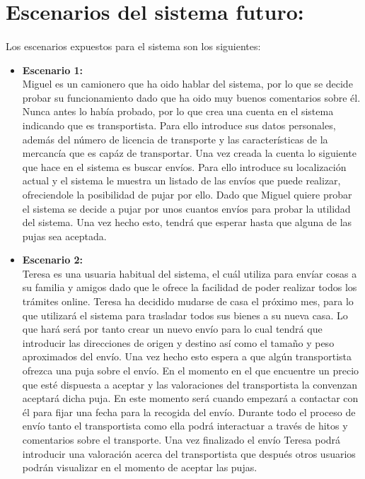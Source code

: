 \documentclass[10pt, a4paper,spanish]{article}
\begin{document}
	\section{Escenarios del sistema futuro:}

		\paragraph{}
		Los escenarios expuestos para el sistema son los siguientes:

		\begin{itemize}
			\item \textbf{Escenario 1:} \\
				Miguel es un camionero que ha oido hablar del sistema, por lo que se decide probar su funcionamiento dado que ha oido muy buenos comentarios sobre él. Nunca antes lo había probado, por lo que crea una cuenta en el sistema indicando que es transportista. Para ello introduce sus datos personales, además del número de licencia de transporte y las características de la mercancía que es capáz de transportar. Una vez creada la cuenta lo siguiente que hace en el sistema es buscar envíos. Para ello introduce su localización actual y el sistema le muestra un listado de las envíos que puede realizar, ofreciendole la posibilidad de pujar por ello. Dado que Miguel quiere probar el sistema se decide a pujar por unos cuantos envíos para probar la utilidad del sistema. Una vez hecho esto, tendrá que esperar hasta que alguna de las pujas sea aceptada.

			\item \textbf{Escenario 2:} \\
				Teresa es una usuaria habitual del sistema, el cuál utiliza para envíar cosas a su familia y amigos dado que le ofrece la facilidad de poder realizar todos los trámites online. Teresa ha decidido mudarse de casa el próximo mes, para lo que utilizará el sistema para trasladar todos sus bienes a su nueva casa. Lo que hará será por tanto crear un nuevo envío para lo cual tendrá que introducir las direcciones de origen y destino así como el tamaño y peso aproximados del envío. Una vez hecho esto espera a que algún transportista ofrezca una puja sobre el envío. En el momento en el que encuentre un precio que esté dispuesta a aceptar y las valoraciones del transportista la convenzan aceptará dicha puja. En este momento será cuando empezará a contactar con él para fijar una fecha para la recogida del envío. Durante todo el proceso de envío tanto el transportista como ella podrá interactuar a través de hitos y comentarios sobre el transporte. Una vez finalizado el envío Teresa podrá introducir una valoración acerca del transportista que después otros usuarios podrán visualizar en el momento de aceptar las pujas.


\end{itemize}
\end{document}
